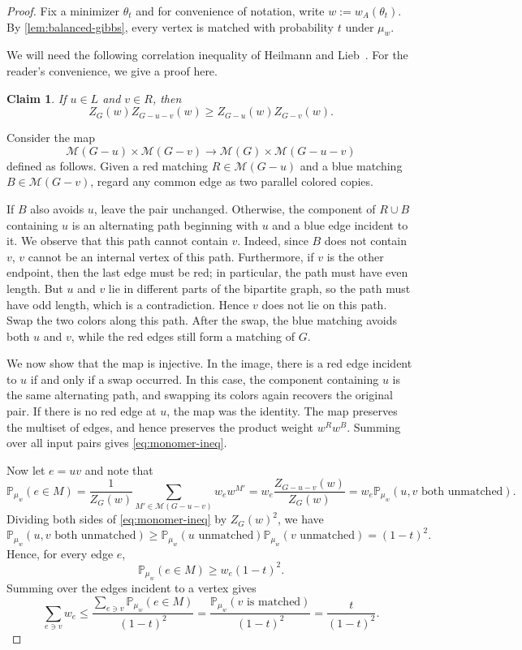 \documentclass[11pt,reqno,letterpaper]{amsart}
\numberwithin{equation}{section}
\newtheorem{claim}[claim]{Claim}
\theoremstyle{definition}
\theoremstyle{remark}
\newcommand{\mb}{\mathbb}
\newcommand{\PP}{\mathbb P}
\newcommand{\cM}{\mathcal M}
\newenvironment{proof*}[1][\proofname]{
  \renewcommand\qedsymbol{\rule{3mm}{3mm}}
  \begin{proof}[#1]}{\end{proof}}
\begin{document}
\begin{proof}
Fix a minimizer $\theta_t$ and for convenience of notation, write
$
  w:=w_A(\theta_t).
$
By \cref{lem:balanced-gibbs}, every vertex is matched with probability
$t$ under $\mu_w$. 

We will need the following correlation inequality of  Heilmann and Lieb~\cite{HL}. For the reader's convenience, we give a proof here. 

\begin{claim}
    If $u\in L$ and $v\in R$, then
\begin{equation}\label{eq:monomer-ineq}
  Z_G(w)Z_{G-u-v}(w)
  \geq
  Z_{G-u}(w)Z_{G-v}(w).
\end{equation}
\end{claim}
\begin{proof*}
    Consider the map
\[
  \cM(G-u)\times\cM(G-v)
  \longrightarrow
  \cM(G)\times\cM(G-u-v)
\]
defined as follows. Given a red matching $R\in\cM(G-u)$ and a blue
matching $B\in\cM(G-v)$, regard any common edge as two parallel
colored copies. 

If $B$ also avoids $u$, leave the pair unchanged.
Otherwise, the component of $R\cup B$ containing $u$ is an
alternating path beginning with $u$ and a blue edge incident to it. We observe that this path cannot contain
$v$. Indeed, since $B$ does not contain $v$, $v$ cannot be an internal vertex of this path. Furthermore, if $v$ is the other endpoint, then the last edge must be red; in particular, the path must have even length. But $u$ and $v$ lie in different parts of the bipartite graph, so the path must have odd length, which is a contradiction. Hence $v$ does not lie on this path. Swap the two colors along this path. After the swap, the blue matching avoids both $u$ and $v$, while the
red edges still form a matching of $G$. 

We now show that the map is injective. In the image, there is a red edge incident to
$u$ if and only if a swap occurred. In this case, the component
containing $u$ is the same alternating path, and swapping its colors
again recovers the original pair. If there is no red edge at $u$, the
map was the identity. The map preserves the multiset of edges, and hence preserves the
product weight $w^R w^B$. Summing over all input pairs gives
\cref{eq:monomer-ineq}.
\end{proof*}

Now let $e=uv$ and note that
\[
  \PP_{\mu_w}(e\in M)
  =\frac{1}{Z_G(w)}\sum_{M'\in\cM(G-u-v)}w_ew^{M'}=
  w_e\frac{Z_{G-u-v}(w)}{Z_G(w)}
  =
  w_e\PP_{\mu_w}(u,v\text{ both unmatched}).
\]
Dividing both sides of \cref{eq:monomer-ineq} by $Z_G(w)^2$, we have
\[
  \PP_{\mu_w}(u,v\text{ both unmatched})
  \geq
  \PP_{\mu_w}(u\text{ unmatched})
  \PP_{\mu_w}(v\text{ unmatched})
  =(1-t)^2.
\]
Hence, for every edge $e$,
\[
  \PP_{\mu_w}(e\in M)\geq w_e(1-t)^2.
\]
Summing over the edges incident to a vertex gives
\begin{equation}\label{eq:degree-bound}
  \sum_{e\ni v}w_e
  \leq
  \frac{\sum_{e \ni v} \mb{P}_{\mu_w}(e \in M)}{(1-t)^2} = \frac{\mb{P}_{\mu_w}(v \text{ is matched})}{(1-t)^2} = \frac{t}{(1-t)^2} .
\end{equation}


\end{proof}
\end{document}
